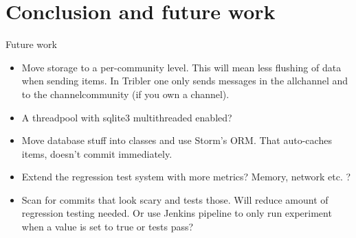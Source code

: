 \chapter{Conclusion and future work}
\label{cpt:conclusion_and_future_work}

Future work

\begin{itemize}
	\item Move storage to a per-community level. This will mean less flushing of data when sending items. In Tribler one only sends messages in the allchannel and to the channelcommunity (if you own a channel).
	\item A threadpool with sqlite3 multithreaded enabled? 
	\item Move database stuff into classes and use Storm's ORM. That auto-caches items, doesn't commit immediately.
	\item Extend the regression test system with more metrics? Memory, network etc. ?
	\item Scan for commits that look scary \cite{huang2014performance} and tests those. Will reduce amount of regression testing needed. Or use Jenkins pipeline to only run experiment when a value is set to true or tests pass?
\end{itemize}